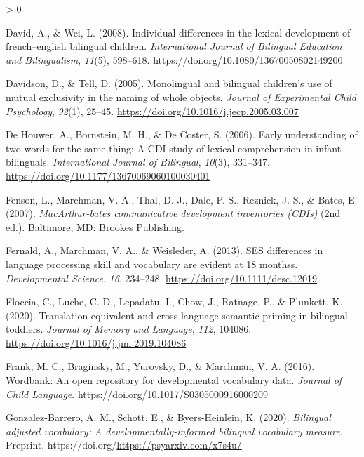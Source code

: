 \documentclass[
  english,
  ,man,floatsintext]{apa6}
\newlength{\cslhangindent}
\newenvironment{CSLReferences}[2] %
 {%
  \setlength{\parindent}{0pt}
  \ifodd #1 \everypar{\setlength{\hangindent}{\cslhangindent}}\ignorespaces\fi
  \ifnum #2 > 0
  \setlength{\parskip}{#2\baselineskip}
  \fi
 }%
 {}
\begin{document}
\begin{CSLReferences}{1}{0}
\leavevmode\hypertarget{ref-David_Wei_2008}{}%
David, A., \& Wei, L. (2008). Individual differences in the lexical development of french--english bilingual children. \emph{International Journal of Bilingual Education and Bilingualism}, \emph{11}(5), 598--618. \url{https://doi.org/10.1080/13670050802149200}

\leavevmode\hypertarget{ref-Davidson_Tell_2005}{}%
Davidson, D., \& Tell, D. (2005). Monolingual and bilingual children's use of mutual exclusivity in the naming of whole objects. \emph{Journal of Experimental Child Psychology}, \emph{92}(1), 25--45. \url{https://doi.org/10.1016/j.jecp.2005.03.007}

\leavevmode\hypertarget{ref-DeHouwer_etal_2006}{}%
De Houwer, A., Bornstein, M. H., \& De Coster, S. (2006). Early understanding of two words for the same thing: A CDI study of lexical comprehension in infant bilinguals. \emph{International Journal of Bilingual}, \emph{10}(3), 331--347. \url{https://doi.org/10.1177/13670069060100030401}

\leavevmode\hypertarget{ref-Fenson_etal_2007}{}%
Fenson, L., Marchman, V. A., Thal, D. J., Dale, P. S., Reznick, J. S., \& Bates, E. (2007). \emph{MacArthur-bates communicative development inventories (CDIs)} (2nd ed.). Baltimore, MD: Brookes Publishing.

\leavevmode\hypertarget{ref-Fernald_etal_2013}{}%
Fernald, A., Marchman, V. A., \& Weisleder, A. (2013). SES differences in language processing skill and vocabulary are evident at 18 monthss. \emph{Developmental Science}, \emph{16}, 234--248. \url{https://doi.org/10.1111/desc.12019}

\leavevmode\hypertarget{ref-Floccia_etal_2020}{}%
Floccia, C., Luche, C. D., Lepadatu, I., Chow, J., Ratnage, P., \& Plunkett, K. (2020). Translation equivalent and cross-language semantic priming in bilingual toddlers. \emph{Journal of Memory and Language}, \emph{112}, 104086. \url{https://doi.org/10.1016/j.jml.2019.104086}

\leavevmode\hypertarget{ref-Frank_etal_2016}{}%
Frank, M. C., Braginsky, M., Yurovsky, D., \& Marchman, V. A. (2016). Wordbank: An open repository for developmental vocabulary data. \emph{Journal of Child Language}. \url{https://doi.org/10.1017/S0305000916000209}

\leavevmode\hypertarget{ref-Gonzalez-Barrero_2020}{}%
Gonzalez-Barrero, A. M., Schott, E., \& Byers-Heinlein, K. (2020). \emph{Bilingual adjusted vocabulary: A developmentally-informed bilingual vocabulary measure}. Preprint. https://doi.org/\url{https://psyarxiv.com/x7s4u/}


\end{CSLReferences}
\end{document}
